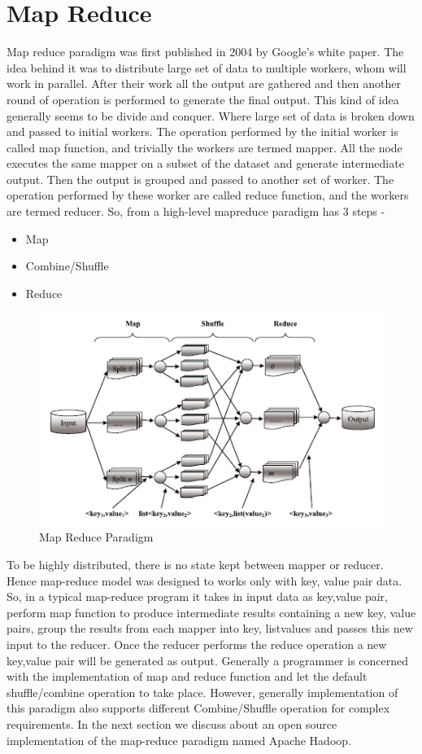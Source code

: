 \documentclass{article}
\begin{document}
\section{Map Reduce}
Map reduce paradigm was first published in 2004 by Google’s white paper. The idea behind it was to distribute large set of data to multiple workers, whom will work in parallel. After their work all the output are gathered and then another round of operation is performed to generate the final output. This kind of idea generally seems to be divide and conquer. Where large set of data is broken down and passed to initial workers. The operation performed by the initial worker is called map function, and trivially the workers are termed mapper. All the node executes the same mapper on a subset of the dataset and generate intermediate output. Then the output is grouped and passed to another set of worker. The operation performed by these worker are called reduce function, and the workers are termed reducer. So, from a high-level mapreduce paradigm has 3 steps - 
\begin{itemize}
\item Map
\item Combine/Shuffle
\item Reduce
\end{itemize}
\begin{figure}[h]
	\centering
	\includegraphics[width=\textwidth]{mr-hadoop-overview}
	\caption{Map Reduce Paradigm}
	\label{fig:mrp}
\end{figure}
To be highly distributed, there is no state kept between mapper or reducer. Hence map-reduce model was designed to works only with {key, value} pair data. So, in a typical map-reduce program it takes in input data as {key,value} pair, perform map function to produce intermediate results containing a new {key, value} pairs, group the results from each mapper into {key, list{values}} and passes this new input to the reducer. Once the reducer performs the reduce operation a new {key,value} pair will be generated as output. Generally a programmer is concerned with the implementation of map and reduce function and let the default shuffle/combine operation to take place. However, generally implementation of this paradigm also supports different Combine/Shuffle operation for complex requirements.
In the next section we discuss about an open source implementation of the map-reduce paradigm named Apache Hadoop.
\end{document}
